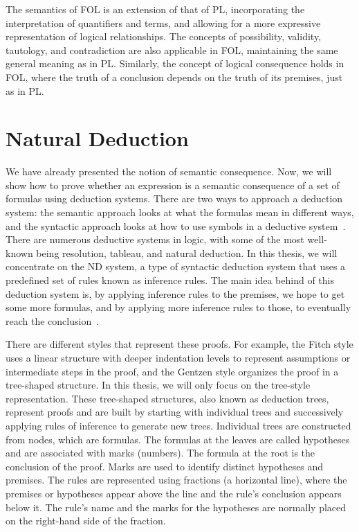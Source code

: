 The semantics of \gls{FOL} is an extension of that of \gls{PL}, incorporating the interpretation of quantifiers and terms, and allowing for a more expressive representation of logical relationships. The concepts of possibility, validity, tautology, and contradiction are also applicable in \gls{FOL}, maintaining the same general meaning as in \gls{PL}. Similarly, the concept of logical consequence holds in \gls{FOL}, where the truth of a conclusion depends on the truth of its premises, just as in \gls{PL}.

\section{Natural Deduction} 

\label{chap:prop-deduction}
We have already presented the notion of semantic consequence. Now, we will show how to prove whether an expression is a semantic consequence of a set of formulas using deduction systems. There are two ways to approach a deduction system: the semantic approach looks at what the formulas mean in different ways, and the syntactic approach looks at how to use symbols in a deductive system~\cite{gouveia_lgica}. There are numerous deductive systems in logic, with some of the most well-known being resolution, tableau, and natural deduction. In this thesis, we will concentrate on the \gls{ND} system, a type of syntactic deduction system that uses a predefined set of rules known as inference rules. The main idea behind of this deduction system is, by applying inference rules to the premises, we hope to get some more formulas, and by applying more inference rules to those, to eventually reach the conclusion~\cite{huth_2004_logic}.

There are different styles that represent these proofs. For example, the Fitch style uses a linear structure with deeper indentation levels to represent assumptions or intermediate steps in the proof, and the Gentzen style organizes the proof in a tree-shaped structure. In this thesis, we will only focus on the tree-style representation. These tree-shaped structures, also known as deduction trees, represent proofs and are built by starting with individual trees and successively applying rules of inference to generate new trees. Individual trees are constructed from nodes, which are formulas. The formulas at the leaves are called hypotheses and are associated with marks (numbers). The formula at the root is the conclusion of the proof. Marks are used to identify distinct hypotheses and premises. The rules are represented using fractions (a horizontal line), where the premises or hypotheses appear above the line and the rule’s conclusion appears below it. The rule’s name and the marks for the hypotheses are normally placed on the right-hand side of the fraction.


